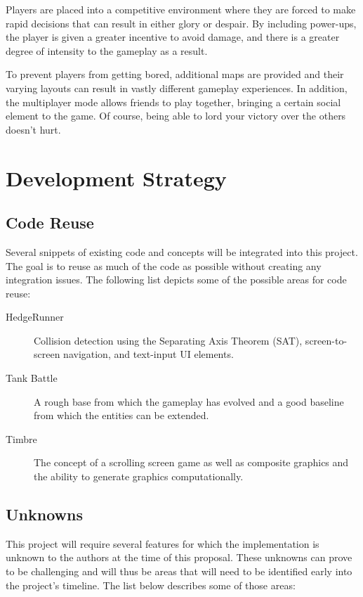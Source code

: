 \documentclass[letterpaper,11pt,twoside]{article}
\begin{document}
Players are placed into a competitive environment where they are forced to make rapid decisions that can result in either glory or despair. By including power-ups, the player is given a greater incentive to avoid damage, and there is a greater degree of intensity to the gameplay as a result.

To prevent players from getting bored, additional maps are provided and their varying layouts can result in vastly different gameplay experiences. In addition, the multiplayer mode allows friends to play together, bringing a certain social element to the game. Of course, being able to lord your victory over the others doesn't hurt.

\section{Development Strategy}

\subsection{Code Reuse}

Several snippets of existing code and concepts will be integrated into this project. The goal is to reuse as much of the code as possible without creating any integration issues. The following list depicts some of the possible areas for code reuse:

\begin{description}
 \item[HedgeRunner] Collision detection using the Separating Axis Theorem (SAT), screen-to-screen navigation, and text-input UI elements.

 \item[Tank Battle] A rough base from which the gameplay has evolved and a good baseline from which the entities can be extended.

 \item[Timbre] The concept of a scrolling screen game as well as composite graphics and the ability to generate graphics computationally.
\end{description}

\subsection{Unknowns}

This project will require several features for which the implementation is unknown to the authors at the time of this proposal. These unknowns can prove to be challenging and will thus be areas that will need to be identified early into the project's timeline. The list below describes some of those areas:
\end{document}
